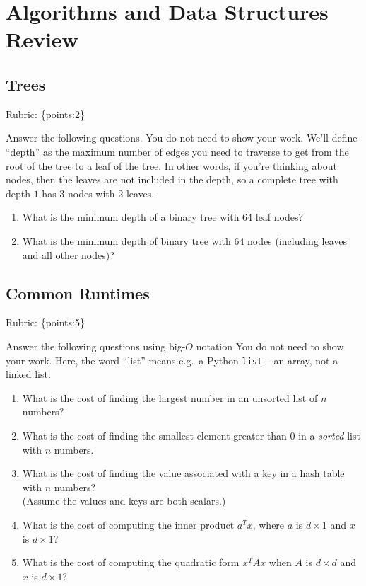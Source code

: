 \documentclass{article}
\def\rubric#1{\gre{Rubric: \{#1\}}}{}
\def\blu#1{{\color{blu}#1}}
\def\gre#1{{\color{gre}#1}}
\begin{document}
	\section{Algorithms and Data Structures Review}

	\subsection{Trees}
	\rubric{points:2}

	\blu{Answer the following questions.} You do not need to show your work. We'll define ``depth'' as the maximum number of edges you need to traverse to get from the root of the tree to a leaf of the tree. In other words, if you're thinking about nodes, then the leaves are not included in the depth, so a complete tree with depth $1$ has 3 nodes with 2 leaves.


	\begin{enumerate}
		\item What is the minimum depth of a binary tree with 64 leaf nodes?
		\item What is the minimum depth of binary tree with 64 nodes (including leaves and all other nodes)?
	\end{enumerate}

	\subsection{Common Runtimes}
	\rubric{points:5}

	\blu{Answer the following questions using big-$O$ notation} You do not need to show your work.
	Here, the word ``list'' means e.g.\ a Python \texttt{list} -- an array, not a linked list.
	\begin{enumerate}
		\item What is the cost of finding the largest number in an unsorted list of $n$ numbers?
		\item What is the cost of finding the smallest element greater than 0 in a \emph{sorted} list with $n$ numbers.
		\item What is the cost of finding the value associated with a key in a hash table with $n$ numbers? \\(Assume the values and keys are both scalars.)
		\item What is the cost of computing the inner product $a^Tx$, where $a$ is $d \times 1$ and $x$ is $d \times 1$?
		\item What is the cost of computing the quadratic form $x^TAx$ when $A$ is $d \times d$ and $x$ is $d \times 1$?
	\end{enumerate}
\end{document}
